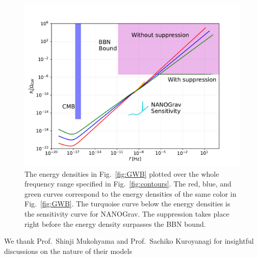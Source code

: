 \begin{figure}[ht!]
    \includegraphics[width=\linewidth]{fig/fig7.pdf}
    \caption{The energy densities in Fig.\ \ref{fig:GWB} plotted over the whole frequency range specified in Fig.\ \ref{fig:contours}. The red, blue, and green curves correspond to the energy densities of the same color in Fig.\ \ref{fig:GWB}. The turquoise curve below the energy densities is the sensitivity curve for NANOGrav. The suppression takes place right before the energy density surpasses the BBN bound.}
    \label{fig:supp}
\end{figure}

We thank Prof.\ Shinji Mukohyama and Prof.\ Sachiko Kuroyanagi for insightful discussions on the nature of their models

